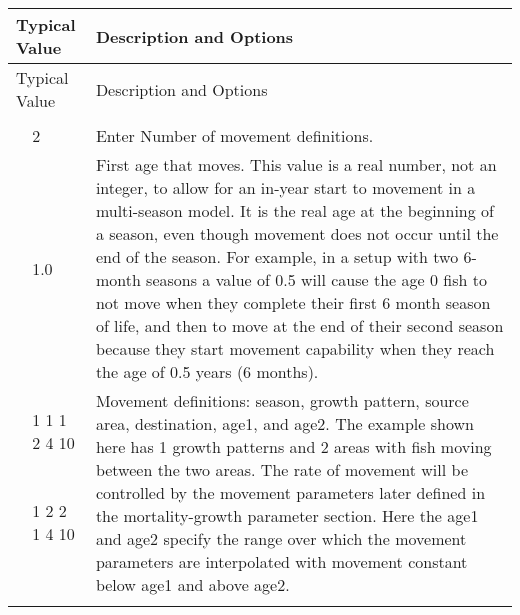 \begin{longtable}{p{0.5cm} p{2cm} p{12cm}}
	\hline
	\multicolumn{2}{l}{Typical Value} & Description and Options\Tstrut\Bstrut\\
	\hline
	\endfirsthead

	\hline
	\multicolumn{2}{l}{Typical Value} & Description and Options\Tstrut\Bstrut\\
	\hline
	\endhead

	\hline
	\endfoot

	\endlastfoot
	
	\multicolumn{3}{l}{COND:  only if areas > 1}\Tstrut\\ 
	& 2   & Enter Number of movement definitions.\Tstrut\\		
	\Tstrut & 1.0  & First age that moves. This value is a real number, not an integer, to allow for an in-year start to movement in a multi-season model.  It is the real age at the beginning of a season, even though movement does not occur until the end of the season. For example, in a  setup with two 6-month seasons a value of 0.5 will cause the age 0 fish to not move when they complete their first 6 month season of life, and then to move at the end of their second season because they start movement capability when they reach the age of 0.5 years (6 months). \\

	\Tstrut & 1 1 1 2 4 10 & \multicolumn{1}{l}{\multirow{5}{6cm}{\parbox{12cm}{Movement definitions: season, growth pattern, source area, destination, age1, and age2. The example shown here has 1 growth patterns and 2 areas with fish moving between the two areas. The rate of movement will be controlled by the movement parameters later defined in the mortality-growth parameter section.  Here the age1 and age2 specify the range over which the movement parameters are interpolated with movement constant below age1 and above age2.}}}\\
	& 1 2 2 1 4 10 &  \Bstrut\\
	\\
	\\
	\\
	\\ 
	\hline
	\end{longtable}

